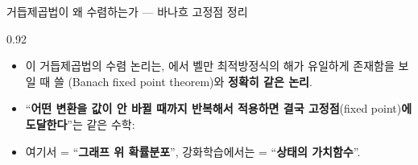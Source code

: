 \begin{frame}{거듭제곱법이 왜 수렴하는가 --- 바나흐 고정점 정리}
\begin{center}\begin{varwidth}{0.92\textwidth}
  \begin{itemize}
    \item 이 거듭제곱법의 수렴 논리는, 에서
      벨만 최적방정식의 해가 유일하게 존재함을 보일 때 쓸
      (Banach fixed point theorem)와
      \textbf{정확히 같은 논리}.
    \item ``\textbf{어떤 변환을 값이 안 바뀔 때까지 반복해서 적용하면
      결국 고정점}(fixed point)\textbf{에 도달한다}''는 같은 수학:
    \item 여기서 = ``\textbf{그래프 위 확률분포}'',
      강화학습에서는 = ``\textbf{상태의 가치함수}''.
  \end{itemize}
\end{varwidth}\end{center}
\end{frame}
